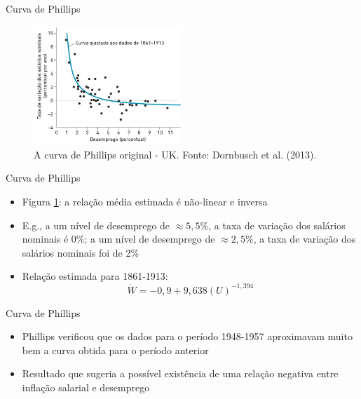 \documentclass[10pt]{beamer}
\begin{document}
\begin{frame}{Curva de Phillips}
    \begin{figure}
        \centering
        \includegraphics[width=0.5\textwidth]{./figures/aula8_fig2.JPG}
        \caption{A curva de Phillips original - UK. Fonte: Dornbusch et al. (2013).}
        \label{fig10}
    \end{figure}
\end{frame}

\begin{frame}{Curva de Phillips}
    \begin{itemize}
        \item Figura \ref{fig10}: a relação média estimada é não-linear e inversa
        \bigskip
        \item E.g., a um nível de desemprego de $\approx 5,5\%$, a taxa de variação dos salários nominais é 0\%; a um nível de desemprego de $\approx 2,5\%$, a taxa de variação dos salários nominais foi de 2\%
        \bigskip
        \item Relação estimada para 1861-1913:
        \begin{equation}
            \dot{W} = -0,9 + 9,638(U)^{-1,394}
            \label{eq3}
        \end{equation}
    \end{itemize}
\end{frame}

\begin{frame}{Curva de Phillips}
    \begin{itemize}
        \item Phillips verificou que os dados para o período 1948-1957 aproximavam muito bem a curva obtida para o período anterior
        \bigskip
        \item Resultado que sugeria a possível existência de uma relação negativa entre inflação salarial e desemprego 
    \end{itemize}
\end{frame}
\end{document}
